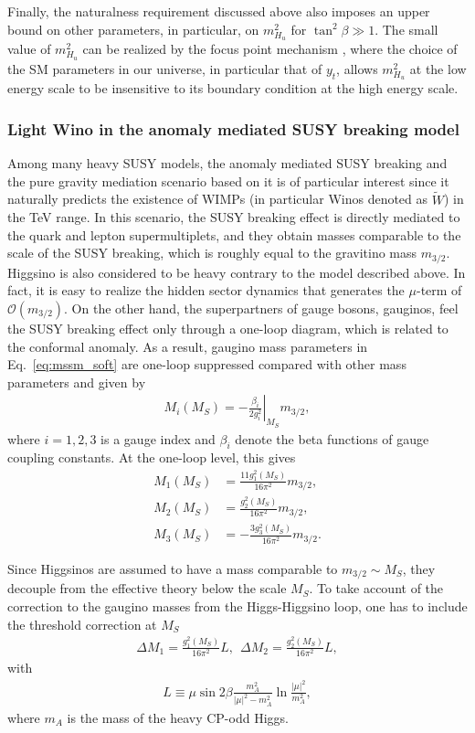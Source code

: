 \documentclass[12pt,twoside,book]{article}
\begin{document}
Finally, the naturalness requirement discussed above also imposes an upper bound on other parameters, in particular, on $m_{H_u}^2$ for $\tan^2 \beta \gg 1$.
The small value of $m_{H_u}^2$ can be realized by the focus point mechanism \cite{Feng:1999hg, Feng:1999mn, Feng:1999zg}, where the choice of the SM parameters in our universe, in particular that of $y_t$, allows $m_{H_u}^2$ at the low energy scale to be insensitive to its boundary condition at the high energy scale.


\subsubsection*{Light Wino in the anomaly mediated SUSY breaking model}

Among many heavy SUSY models, the anomaly mediated SUSY breaking \cite{Giudice:1998xp, Randall:1998uk} and the pure gravity mediation scenario based on it \cite{Ibe:2006de, Ibe:2011aa, ArkaniHamed:2012gw} is of particular interest since it naturally predicts the existence of WIMPs (in particular Winos denoted as $\tilde{W}$) in the TeV range.
In this scenario, the SUSY breaking effect is directly mediated to the quark and lepton supermultiplets, and they obtain masses comparable to the scale of the SUSY breaking, which is roughly equal to the gravitino mass $m_{3/2}$.
Higgsino is also considered to be heavy contrary to the model described above.
In fact, it is easy to realize the hidden sector dynamics that generates the $\mu$-term of $\mathcal{O} (m_{3/2})$.
On the other hand, the superpartners of gauge bosons, gauginos, feel the SUSY breaking effect only through a one-loop diagram, which is related to the conformal anomaly.
As a result, gaugino mass parameters in Eq.~\eqref{eq:mssm_soft} are one-loop suppressed compared with other mass parameters and given by
\begin{align}
  M_i (M_S) = -\left. \frac{\beta_i}{2 g_i^2} \right|_{M_S} m_{3/2},
\end{align}
where $i=1,2,3$ is a gauge index and $\beta_i$ denote the beta functions of gauge coupling constants.
At the one-loop level, this gives
\begin{align}
  M_1 (M_S) &= \frac{11 g_1^2 (M_S)}{16 \pi^2} m_{3/2},\\
  M_2 (M_S) &= \frac{g_2^2 (M_S)}{16 \pi^2} m_{3/2},\\
  M_3 (M_S) &= -\frac{3 g_3^2 (M_S)}{16 \pi^2} m_{3/2}.
\end{align}

Since Higgsinos are assumed to have a mass comparable to $m_{3/2} \sim M_S$, they decouple from the effective theory below the scale $M_S$.
To take account of the correction to the gaugino masses from the Higgs-Higgsino loop, one has to include the threshold correction at $M_S$
\begin{align}
  \Delta M_1 = \frac{g_1^2 (M_S)}{16\pi^2} L,
  ~~
  \Delta M_2 = \frac{g_2^2 (M_S)}{16\pi^2} L,
\end{align}
with
\begin{align}
  L \equiv \mu \sin 2\beta \frac{m_A^2}{|\mu|^2 - m_A^2} \ln \frac{|\mu|^2}{m_A^2},
\end{align}
where $m_A$ is the mass of the heavy CP-odd Higgs.
\end{document}
